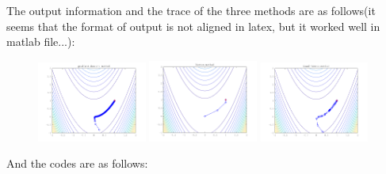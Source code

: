 \documentclass[10pt]{article}
\begin{document}
The output information and the trace of the three methods are as follows(it seems that the format of output is not aligned in latex, but it worked well in matlab file...):

\begin{figure}[htbp]
	\centering
	\includegraphics[width=0.32\textwidth]{../code/result/gradient_descent.png}
	\includegraphics[width=0.32\textwidth]{../code/result/Newton_method.png}
	\includegraphics[width=0.32\textwidth]{../code/result/Quasi_Newton_method.png}
\end{figure}



And the codes are as follows:\\


	











\end{document}

